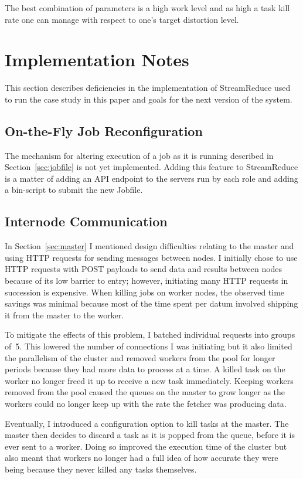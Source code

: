 \documentclass[12pt,twocolumn]{article}
\begin{document}
The best combination of parameters is a high work level and as high a task kill rate one can
manage with respect to one's target distortion level.


\section{Implementation Notes}
\label{sec:discussion}
This section describes deficiencies in the implementation of StreamReduce used to run the
case study
in this paper and goals for the next version of the system.

\subsection{On-the-Fly Job Reconfiguration}
The mechanism for altering execution of a job as it is running described in
Section~\ref{sec:jobfile}
is not yet implemented. Adding this feature to StreamReduce is a matter of adding an API
endpoint
to the servers run by each role and adding a bin-script to submit the new Jobfile.

\subsection{Internode Communication}
In Section~\ref{sec:master} I mentioned design difficulties relating to the master and using
HTTP
requests for sending messages between nodes. I initially chose to use HTTP requests with
POST payloads
to send data and results between nodes because of its low barrier to entry; however,
initiating many
HTTP requests in succession is expensive. When killing jobs on worker nodes, the observed
time savings
was minimal because most of the time spent per datum involved shipping it from the master
to the worker.

To mitigate the effects of this problem, I batched individual requests into groups of~5. This
lowered the number of connections I was initiating but it also limited the parallelism of the
cluster
and removed workers from the pool for longer periods because they had more data to
process at a time.
A killed task on the worker no longer freed it up to receive a new task immediately.
Keeping workers removed from the pool caused the queues on the master to grow longer as
the workers
could no longer keep up with the rate the fetcher was producing data.

Eventually, I introduced a configuration option to kill tasks at the master. The master then
decides to discard a task as it is popped from the queue, before it is ever sent to a worker.
Doing so improved the execution time of the cluster but also meant that workers no longer
had
a full idea of how accurate they were being because they never killed any tasks themselves.
\end{document}
